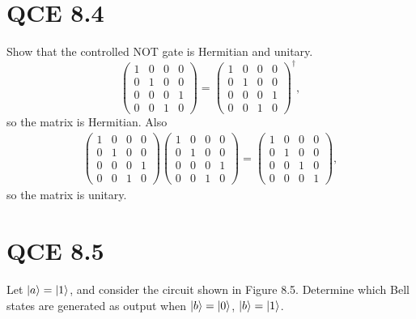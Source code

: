 \documentclass[10pt]{article}
\begin{document}
\section*{QCE 8.4}
Show that the controlled NOT gate is Hermitian and unitary.
\[
\begin{pmatrix}
1 & 0 & 0 & 0 \\
0 & 1 & 0 & 0 \\
0 & 0 & 0 & 1 \\
0 & 0 & 1 & 0
\end{pmatrix}
= 
\begin{pmatrix}
1 & 0 & 0 & 0 \\
0 & 1 & 0 & 0 \\
0 & 0 & 0 & 1 \\
0 & 0 & 1 & 0
\end{pmatrix}^{\dag},
\]
so the matrix is Hermitian. Also
\begin{align*}
\begin{pmatrix}
1 & 0 & 0 & 0 \\
0 & 1 & 0 & 0 \\
0 & 0 & 0 & 1 \\
0 & 0 & 1 & 0
\end{pmatrix}
\begin{pmatrix}
1 & 0 & 0 & 0 \\
0 & 1 & 0 & 0 \\
0 & 0 & 0 & 1 \\
0 & 0 & 1 & 0
\end{pmatrix}
= 
\begin{pmatrix}
1 & 0 & 0 & 0 \\
0 & 1 & 0 & 0 \\
0 & 0 & 1 & 0 \\
0 & 0 & 0 & 1
\end{pmatrix},
\end{align*}
so the matrix is unitary.

\section*{QCE 8.5}
Let $\ket{a} = \ket{1}$, and consider the circuit shown in Figure 8.5. Determine which Bell states are generated as output when $\ket{b} = \ket{0}$, $\ket{b} = \ket{1}$.
\end{document}
